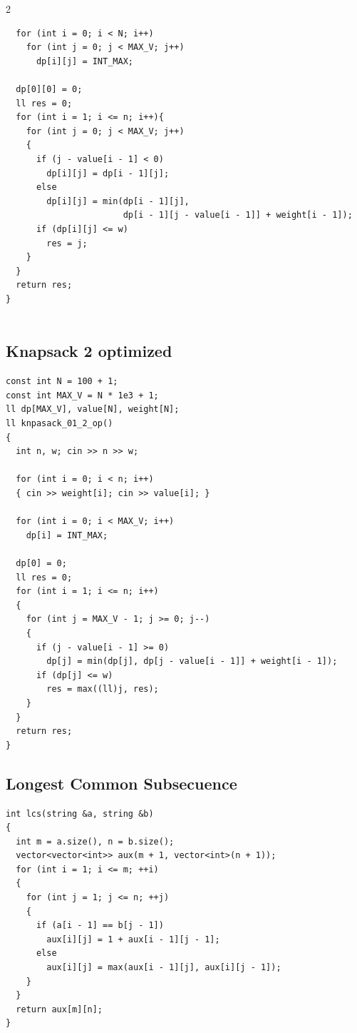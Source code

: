 \documentclass[twoside]{article}
\begin{document}
\begin{multicols*}{2}
\begin{verbatim}
  for (int i = 0; i < N; i++)
    for (int j = 0; j < MAX_V; j++)
      dp[i][j] = INT_MAX;  
  
  dp[0][0] = 0;
  ll res = 0;
  for (int i = 1; i <= n; i++){
    for (int j = 0; j < MAX_V; j++)
    {
      if (j - value[i - 1] < 0)
        dp[i][j] = dp[i - 1][j];
      else
        dp[i][j] = min(dp[i - 1][j], 
                       dp[i - 1][j - value[i - 1]] + weight[i - 1]);
      if (dp[i][j] <= w)
        res = j;
    }
  }
  return res;
}


\end{verbatim}

	{
		\subsection*{Knapsack 2 optimized}
	}
	\begin{verbatim}
const int N = 100 + 1;
const int MAX_V = N * 1e3 + 1;
ll dp[MAX_V], value[N], weight[N];
ll knpasack_01_2_op()
{
  int n, w; cin >> n >> w;

  for (int i = 0; i < n; i++)
  { cin >> weight[i]; cin >> value[i]; }

  for (int i = 0; i < MAX_V; i++)
    dp[i] = INT_MAX;
  
  dp[0] = 0;
  ll res = 0;
  for (int i = 1; i <= n; i++)
  {
    for (int j = MAX_V - 1; j >= 0; j--)
    {
      if (j - value[i - 1] >= 0)
        dp[j] = min(dp[j], dp[j - value[i - 1]] + weight[i - 1]);
      if (dp[j] <= w)
        res = max((ll)j, res);
    }
  }
  return res;
}

\end{verbatim}

	{
		\subsection*{Longest Common Subsecuence}
	}
	\begin{verbatim}
int lcs(string &a, string &b)
{
  int m = a.size(), n = b.size();
  vector<vector<int>> aux(m + 1, vector<int>(n + 1));
  for (int i = 1; i <= m; ++i)
  {
    for (int j = 1; j <= n; ++j)
    {
      if (a[i - 1] == b[j - 1])
        aux[i][j] = 1 + aux[i - 1][j - 1];
      else
        aux[i][j] = max(aux[i - 1][j], aux[i][j - 1]);
    }
  }
  return aux[m][n];
}
\end{verbatim}


\end{multicols*}
\end{document}
